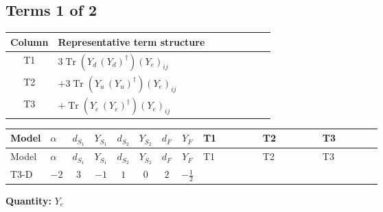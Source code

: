 \documentclass[8pt]{article}
\begin{document}
\begin{landscape}
\subsection*{Terms 1 of 2}
\begin{center}
\begin{tabular}{@{}c >{\raggedright\arraybackslash}p{0.82\linewidth}@{}}
\toprule
Column & Representative term structure \\
\midrule
T1 & \(\displaystyle 3 \operatorname{Tr}\!\left({Y_d}\,\left({Y_d}\right)^{\dagger}\right) \left({Y_e}\right)_{ij}\) \\
\midrule
T2 & \(\displaystyle +3 \operatorname{Tr}\!\left({Y_u}\,\left({Y_u}\right)^{\dagger}\right) \left({Y_e}\right)_{ij}\) \\
\midrule
T3 & \(\displaystyle +\operatorname{Tr}\!\left({Y_e}\,\left({Y_e}\right)^{\dagger}\right) \left({Y_e}\right)_{ij}\) \\
\midrule
\bottomrule
\end{tabular}
\end{center}
\smallskip
\tiny
\begin{longtable}{@{}llcccccc >{\raggedright\arraybackslash}p{0.21\linewidth} >{\raggedright\arraybackslash}p{0.21\linewidth} >{\raggedright\arraybackslash}p{0.21\linewidth}@{}}
\toprule
Model & $\alpha$ & $d_{S_1}$ & $Y_{S_1}$ & $d_{S_2}$ & $Y_{S_2}$ & $d_F$ & $Y_F$ & T1 & T2 & T3 \\
\midrule
\endfirsthead
\toprule
Model & $\alpha$ & $d_{S_1}$ & $Y_{S_1}$ & $d_{S_2}$ & $Y_{S_2}$ & $d_F$ & $Y_F$ & T1 & T2 & T3 \\
\midrule
\endhead
T3-D & $-2$ & $3$ & $-1$ & $1$ & $0$ & $2$ & $-\frac{1}{2}$ & \scriptsize\adjustbox{max width=\linewidth}{$\begin{gathered} 3 \operatorname{Tr}\!\left({Y_d}\,\left({Y_d}\right)^{\dagger}\right) \left({Y_e}\right)_{ij}\end{gathered}$} & \scriptsize\adjustbox{max width=\linewidth}{$\begin{gathered} +3 \operatorname{Tr}\!\left({Y_u}\,\left({Y_u}\right)^{\dagger}\right) \left({Y_e}\right)_{ij}\end{gathered}$} & \scriptsize\adjustbox{max width=\linewidth}{$\begin{gathered} +\operatorname{Tr}\!\left({Y_e}\,\left({Y_e}\right)^{\dagger}\right) \left({Y_e}\right)_{ij}\end{gathered}$} \\
\midrule
\bottomrule
\end{longtable}
\clearpage
\noindent\textbf{Quantity: }$Y_e$\par\smallskip

\end{landscape}
\end{document}
